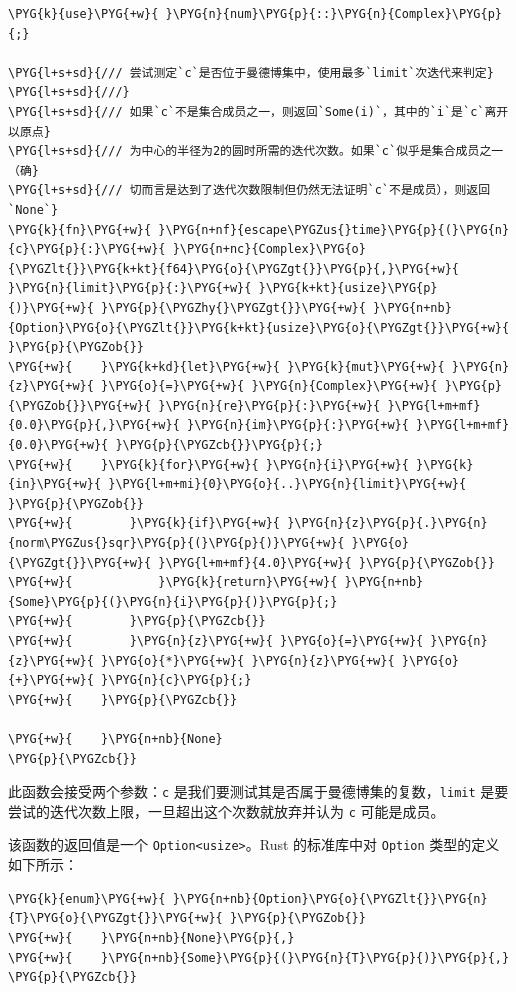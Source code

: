\begin{Verbatim}[commandchars=\\\{\},breaklines=true,breakanywhere=true,fontsize=\codefont,xleftmargin=17bp]
\PYG{k}{use}\PYG{+w}{ }\PYG{n}{num}\PYG{p}{::}\PYG{n}{Complex}\PYG{p}{;}

\PYG{l+s+sd}{/// 尝试测定`c`是否位于曼德博集中，使用最多`limit`次迭代来判定}
\PYG{l+s+sd}{///}
\PYG{l+s+sd}{/// 如果`c`不是集合成员之一，则返回`Some(i)`，其中的`i`是`c`离开以原点}
\PYG{l+s+sd}{/// 为中心的半径为2的圆时所需的迭代次数。如果`c`似乎是集合成员之一（确}
\PYG{l+s+sd}{/// 切而言是达到了迭代次数限制但仍然无法证明`c`不是成员），则返回`None`}
\PYG{k}{fn}\PYG{+w}{ }\PYG{n+nf}{escape\PYGZus{}time}\PYG{p}{(}\PYG{n}{c}\PYG{p}{:}\PYG{+w}{ }\PYG{n+nc}{Complex}\PYG{o}{\PYGZlt{}}\PYG{k+kt}{f64}\PYG{o}{\PYGZgt{}}\PYG{p}{,}\PYG{+w}{ }\PYG{n}{limit}\PYG{p}{:}\PYG{+w}{ }\PYG{k+kt}{usize}\PYG{p}{)}\PYG{+w}{ }\PYG{p}{\PYGZhy{}\PYGZgt{}}\PYG{+w}{ }\PYG{n+nb}{Option}\PYG{o}{\PYGZlt{}}\PYG{k+kt}{usize}\PYG{o}{\PYGZgt{}}\PYG{+w}{ }\PYG{p}{\PYGZob{}}
\PYG{+w}{    }\PYG{k+kd}{let}\PYG{+w}{ }\PYG{k}{mut}\PYG{+w}{ }\PYG{n}{z}\PYG{+w}{ }\PYG{o}{=}\PYG{+w}{ }\PYG{n}{Complex}\PYG{+w}{ }\PYG{p}{\PYGZob{}}\PYG{+w}{ }\PYG{n}{re}\PYG{p}{:}\PYG{+w}{ }\PYG{l+m+mf}{0.0}\PYG{p}{,}\PYG{+w}{ }\PYG{n}{im}\PYG{p}{:}\PYG{+w}{ }\PYG{l+m+mf}{0.0}\PYG{+w}{ }\PYG{p}{\PYGZcb{}}\PYG{p}{;}
\PYG{+w}{    }\PYG{k}{for}\PYG{+w}{ }\PYG{n}{i}\PYG{+w}{ }\PYG{k}{in}\PYG{+w}{ }\PYG{l+m+mi}{0}\PYG{o}{..}\PYG{n}{limit}\PYG{+w}{ }\PYG{p}{\PYGZob{}}
\PYG{+w}{        }\PYG{k}{if}\PYG{+w}{ }\PYG{n}{z}\PYG{p}{.}\PYG{n}{norm\PYGZus{}sqr}\PYG{p}{(}\PYG{p}{)}\PYG{+w}{ }\PYG{o}{\PYGZgt{}}\PYG{+w}{ }\PYG{l+m+mf}{4.0}\PYG{+w}{ }\PYG{p}{\PYGZob{}}
\PYG{+w}{            }\PYG{k}{return}\PYG{+w}{ }\PYG{n+nb}{Some}\PYG{p}{(}\PYG{n}{i}\PYG{p}{)}\PYG{p}{;}
\PYG{+w}{        }\PYG{p}{\PYGZcb{}}
\PYG{+w}{        }\PYG{n}{z}\PYG{+w}{ }\PYG{o}{=}\PYG{+w}{ }\PYG{n}{z}\PYG{+w}{ }\PYG{o}{*}\PYG{+w}{ }\PYG{n}{z}\PYG{+w}{ }\PYG{o}{+}\PYG{+w}{ }\PYG{n}{c}\PYG{p}{;}
\PYG{+w}{    }\PYG{p}{\PYGZcb{}}

\PYG{+w}{    }\PYG{n+nb}{None}
\PYG{p}{\PYGZcb{}}
\end{Verbatim}

此函数会接受两个参数：\texttt{c} 是我们要测试其是否属于曼德博集的复数，\texttt{limit} 是要尝试的迭代次数上限，一旦超出这个次数就放弃并认为 \texttt{c} 可能是成员。

该函数的返回值是一个 \texttt{Option<usize>}。Rust 的标准库中对 \texttt{Option} 类型的定义如下所示：

\begin{Verbatim}[commandchars=\\\{\},breaklines=true,breakanywhere=true,fontsize=\codefont,xleftmargin=17bp]
\PYG{k}{enum}\PYG{+w}{ }\PYG{n+nb}{Option}\PYG{o}{\PYGZlt{}}\PYG{n}{T}\PYG{o}{\PYGZgt{}}\PYG{+w}{ }\PYG{p}{\PYGZob{}}
\PYG{+w}{    }\PYG{n+nb}{None}\PYG{p}{,}
\PYG{+w}{    }\PYG{n+nb}{Some}\PYG{p}{(}\PYG{n}{T}\PYG{p}{)}\PYG{p}{,}
\PYG{p}{\PYGZcb{}}
\end{Verbatim}

